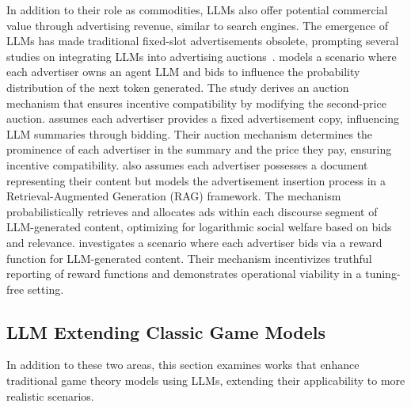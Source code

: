In addition to their role as commodities, LLMs also offer potential commercial value through advertising revenue, similar to search engines. 
The emergence of LLMs has made traditional fixed-slot advertisements obsolete, prompting several studies on integrating LLMs into advertising auctions~\cite{feizi2023online}. 
\cite{duetting2024mechanism} models a scenario where each advertiser owns an agent LLM and bids to influence the probability distribution of the next token generated. The study derives an auction mechanism that ensures incentive compatibility by modifying the second-price auction.
\cite{adSummaries} assumes each advertiser provides a fixed advertisement copy, influencing LLM summaries through bidding. Their auction mechanism determines the prominence of each advertiser in the summary and the price they pay, ensuring incentive compatibility.
\cite{adRAG} also assumes each advertiser possesses a document representing their content but models the advertisement insertion process in a Retrieval-Augmented Generation (RAG) framework. The mechanism probabilistically retrieves and allocates ads within each discourse segment of LLM-generated content, optimizing for logarithmic social welfare based on bids and relevance.
\cite{soumalias2024truthful} investigates a scenario where each advertiser bids via a reward function for LLM-generated content. Their mechanism incentivizes truthful reporting of reward functions and demonstrates operational viability in a tuning-free setting.

\subsection{LLM Extending Classic Game Models}\label{secsub:LLM_modification}
In addition to these two areas, this section examines works that enhance traditional game theory models using LLMs, extending their applicability to more realistic scenarios.

